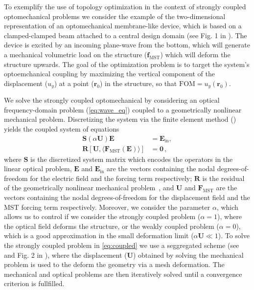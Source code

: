 To exemplify the use of topology optimization in the context of strongly coupled optomechanical problems we consider the example of the two-dimensional representation of an optomechanical membrane-like device, which
is based on a clamped-clamped beam attached to a central design domain (see Fig. 1 in ). The device is excited by an incoming plane-wave from the bottom, which will generate a mechanical volumetric load on the structure ($\mathbf{f}_\text{MST}$)
which will deform the structure upwards. The goal of the optimization problem is to target the system's optoemchanical coupling by maximizing the vertical component of the displacement ($u_y$) at a point ($\mathbf{r}_0$)
in the structure, so that $\text{FOM}=u_y(\mathbf{r}_0)$.

We solve the strongly coupled optomechanical by considering an optical frequency-domain problem (\eqref{eq:wave_eq}) coupled to a geometrically nonlinear mechanical problem. Discretizing the system via the finite element
method () yields the coupled system of equations
\begin{equation}\label{eq:coupled}
    \begin{aligned}
        \mathbf{S}\left(\alpha\mathbf{U}\right) \mathbf{E} &= \mathbf{E}_\text{in} , \\
        \mathbf{R}[\mathbf{U}, \langle \mathbf{F}_\text{MST}(\mathbf{E})\rangle] &=\mathbf{0}\,,
    \end{aligned}
    \end{equation}
where $\mathbf{S}$ is the discretized system matrix which encodes the operators
 in the linear optical problem, $\mathbf{E}$ and 
 $\mathbf{E}_\text{in}$ are the vectors containing the nodal degrees-of-freedom for the electric 
field and the forcing term respectively; $\mathbf{R}$ is the residual of the
 geometrically nonlinear mechanical problem~\cite{cook_concepts_2001}, and 
 $\mathbf{U}$ and $\mathbf{F}_\text{MST}$ are the vectors containing the nodal
  degrees-of-freedom for the displacement field and the MST forcing term respectively. 
  Moreover, we consider the parameter $\alpha$, which allows us to control if we consider 
  the strongly coupled problem ($\alpha=1$), where the optical field deforms the structure, 
  or the weakly coupled problem ($\alpha=0$), which is a good approximation in the small deformation 
  limit ($\alpha\mathbf{U} \ll 1$). To solve the strongly coupled problem in 
  \eqref{eq:coupled} we use a seggregated scheme (see  and Fig. 2 in ), where the displacement ($\mathbf{U}$) obtained
   by solving the mechanical problem is used to the deform the geometry via a mesh deformation. The mechanical and
    optical problems are then iteratively solved until a convergence criterion is fullfilled.


